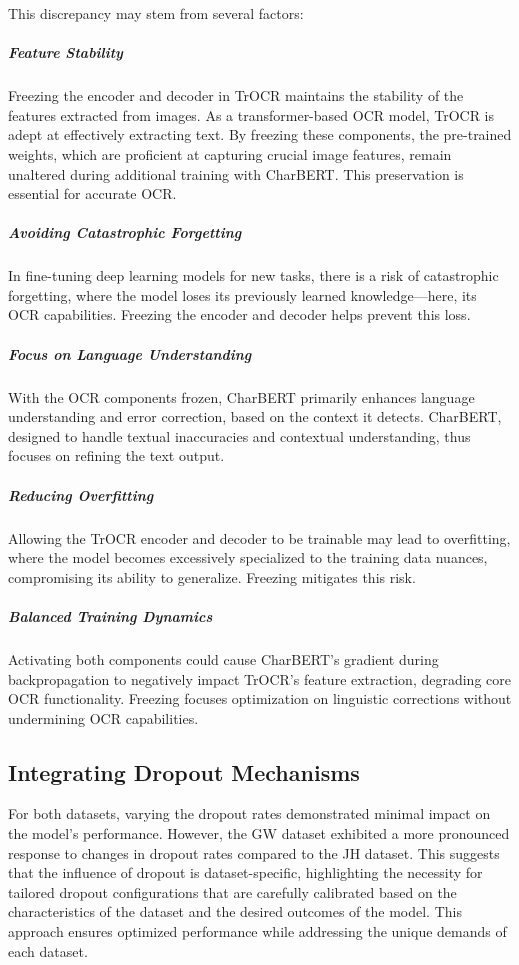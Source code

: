 This discrepancy may stem from several factors:

\subparagraph*{Feature Stability}
Freezing the encoder and decoder in TrOCR maintains the stability of the features extracted from images. As a transformer-based OCR model, TrOCR is adept at effectively extracting text. By freezing these components, the pre-trained weights, which are proficient at capturing crucial image features, remain unaltered during additional training with CharBERT. This preservation is essential for accurate OCR.

\subparagraph*{Avoiding Catastrophic Forgetting}
In fine-tuning deep learning models for new tasks, there is a risk of catastrophic forgetting, where the model loses its previously learned knowledge—here, its OCR capabilities. Freezing the encoder and decoder helps prevent this loss.

\subparagraph*{Focus on Language Understanding}
With the OCR components frozen, CharBERT primarily enhances language understanding and error correction, based on the context it detects. CharBERT, designed to handle textual inaccuracies and contextual understanding, thus focuses on refining the text output.

\subparagraph*{Reducing Overfitting}
Allowing the TrOCR encoder and decoder to be trainable may lead to overfitting, where the model becomes excessively specialized to the training data nuances, compromising its ability to generalize. Freezing mitigates this risk.

\subparagraph*{Balanced Training Dynamics}
Activating both components could cause CharBERT’s gradient during backpropagation to negatively impact TrOCR’s feature extraction, degrading core OCR functionality. Freezing focuses optimization on linguistic corrections without undermining OCR capabilities.

\subsection{Integrating Dropout Mechanisms}
\label{subsec:5_integrating_dropout_mechanisms}
For both datasets, varying the dropout rates demonstrated minimal impact on the model's performance. However, the GW dataset exhibited a more pronounced response to changes in dropout rates compared to the JH dataset. This suggests that the influence of dropout is dataset-specific, highlighting the necessity for tailored dropout configurations that are carefully calibrated based on the characteristics of the dataset and the desired outcomes of the model. This approach ensures optimized performance while addressing the unique demands of each dataset.


